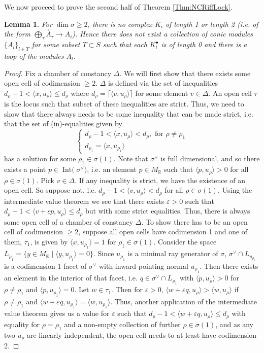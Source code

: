 \documentclass[reqno, 12pt]{amsart}
\newtheorem{lemma}[theorem]{Lemma}
\theoremstyle{definition}
\numberwithin{equation}{section}
\newcommand{\R}{\mathbb{R}}
\newcommand{\opA}{\overset{\circ}{A}}
\begin{document}
We now proceed to prove the second half of Theorem \ref{Thm:NCRiffLock}.
\begin{lemma}
    \label{Lem:NoPureDegree1Loop}
    For $\dim \sigma\ge 2$, there is no complex $K_i$ of length 1 or length 2 (i.e. of the form $\bigoplus_{\tau} \opA_\tau\rightarrow A_i$). 
    Hence there does not exist a collection of conic modules $\{A_l\}_{l\in T}$ for some subset $T\subset S$ such that each $K_l^\bullet$ is of length 0 and there is a loop of the modules $A_l$.
\end{lemma}
\begin{proof}
Fix a chamber of constancy $\Delta$. We will first show that there exists some open cell of codimension $\ge 2$. $\Delta$ is defined via the set of inequalities $d_\rho-1<\langle x,u_\rho\rangle \le d_\rho$ where $d_\rho=\lceil\langle v,u_\rho\rangle \rceil$ for some element $v\in\Delta$. An open cell $\tau$ is the locus such that subset of these inequalities are strict. Thus, we need to show that there always needs to be some inequality that can be made strict, i.e. that the set of (in)-equalities given by \[\begin{cases}
    d_\rho-1<\langle x,u_\rho\rangle <d_\rho, \text{ for }\rho\neq \rho_1\\
    d_{\rho_1}=\langle x,u_{\rho_1}\rangle
\end{cases}\]
has a solution for some $\rho_1\in \sigma(1)$. Note that $\sigma^\vee$ is full dimensional, and so there exists a point $p\in \operatorname{Int(}\sigma^\vee)$, i.e. an element $p\in M_\R$ such that $\langle p, u_\rho\rangle>0$ for all $\rho\in \sigma(1)$. Pick $v\in \Delta$. If any inequality is strict, we have the existence of an open cell. So suppose not, i.e. $d_\rho-1<\langle v,u_\rho\rangle<d_\rho$ for all $\rho\in \sigma(1)$. 
Using the intermediate value theorem we see that there exists $\varepsilon>0$ such that $d_\rho-1< \langle v+\epsilon p, u_\rho\rangle\le d_\rho$ but with some strict equalities. 
Thus, there is always some open cell of a chamber of constancy $\Delta$. To show there has to be an open cell of codimension $\ge 2$, suppose all open cells have codimension 1 and one of them, $\tau_1$, is given by $\langle x,u_{\rho_1}\rangle =1$ for $\rho_1\in \sigma(1)$. 
Consider the space $L_{\rho_1}=\{y\in M_\R\mid\langle y,u_{\rho_1}\rangle=0\}$. Since $u_{\rho_1}$ is a minimal ray generator of $\sigma$, $\sigma^\vee\cap L_{u_{\rho_1}}$ is a codimension 1 facet of $\sigma^\vee$ with inward pointing normal $u_{\rho_1}$. Then there exists an element in the interior of that facet, i.e. $q\in \sigma^\vee\cap L_{\rho_1}$ with $\langle p,u_\rho\rangle>0$ for $\rho\neq \rho_1$ and $\langle p,u_{\rho_1}\rangle=0$. Let $w\in \tau_1$. Then for $\varepsilon>0$, $\langle w+\varepsilon q,u_\rho\rangle>\langle w,u_\rho\rangle$ if $\rho\neq \rho_1$ and $\langle w+\varepsilon q,u_{\rho_1}\rangle=\langle w,u_{\rho_1}\rangle$. Thus, another application of the intermediate value theorem gives us a value for $\varepsilon$ such that $d_\rho-1<\langle w+\varepsilon q,u_\rho\rangle\le d_\rho$ with equality for $\rho=\rho_1$ and a non-empty collection of further $\rho\in \sigma(1)$, and as any two $u_\rho$ are linearly independent, the open cell needs to at least have codimension 2. 
\end{proof}
\end{document}
